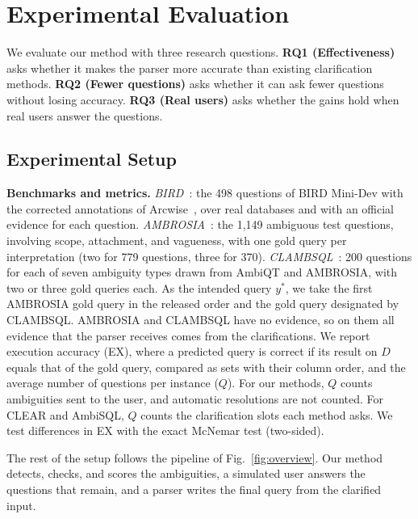 \section{Experimental Evaluation}
\label{sec:exp}

We evaluate our method with three research questions.
\textbf{RQ1 (Effectiveness)} asks whether it makes the parser more
accurate than existing clarification methods.
\textbf{RQ2 (Fewer questions)} asks whether it can ask fewer questions
without losing accuracy. \textbf{RQ3 (Real users)} asks whether the
gains hold when real users answer the questions.

\subsection{Experimental Setup}
\label{sec:exp-setup}

\textbf{Benchmarks and metrics.} \emph{BIRD}~\cite{dataset-bird}: the 498 questions
of BIRD Mini-Dev with the corrected annotations of
Arcwise~\cite{arcwise}, over real databases and with an official
evidence for each question. \emph{AMBROSIA}~\cite{ambrosia}: the
1{,}149 ambiguous test questions, involving scope, attachment, and
vagueness, with one gold query per interpretation (two for 779
questions, three for 370). \emph{CLAMBSQL}~\cite{zhang2025clear}:
200 questions for each of seven ambiguity types drawn from AmbiQT
and AMBROSIA, with two or three gold queries each. As the intended
query $y^{*}$, we take the first AMBROSIA gold query in the released
order and the gold query designated by CLAMBSQL. AMBROSIA and
CLAMBSQL have no evidence, so on them all evidence that the parser
receives comes from the clarifications. We report execution accuracy
(EX), where a predicted query is correct if its result on $D$ equals
that of the gold query, compared as sets with their column order, and
the average number of questions per instance ($Q$). For our methods,
$Q$ counts ambiguities sent to the user, and automatic resolutions are
not counted. For CLEAR and AmbiSQL, $Q$ counts the clarification slots
each method asks. We test differences in EX with the exact McNemar
test (two-sided).

The rest of the setup follows the pipeline of
Fig.~\ref{fig:overview}. Our method detects, checks, and scores the
ambiguities, a simulated user answers the questions that remain, and
a parser writes the final query from the clarified input.


